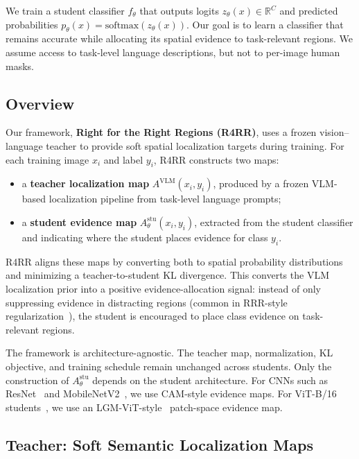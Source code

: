 We train a student classifier $f_\theta$ that outputs logits $z_\theta(x)\in\mathbb{R}^{C}$ and predicted probabilities $p_\theta(x)=\mathrm{softmax}(z_\theta(x))$. Our goal is to learn a classifier that remains accurate while allocating its spatial evidence to task-relevant regions. We assume access to task-level language descriptions, but not to per-image human masks.

\subsection{Overview}
\label{sec:overview}

Our framework, \textbf{Right for the Right Regions (R4RR)}, uses a frozen vision--language teacher to provide soft spatial localization targets during training. For each training image $x_i$ and label $y_i$, R4RR constructs two maps:
\begin{itemize}
\item a \textbf{teacher localization map} $A^{\mathrm{VLM}}(x_i,y_i)$, produced by a frozen VLM-based localization pipeline from task-level language prompts;
\item a \textbf{student evidence map} $A^{\mathrm{stu}}_\theta(x_i,y_i)$, extracted from the student classifier and indicating where the student places evidence for class $y_i$.
\end{itemize}

R4RR aligns these maps by converting both to spatial probability distributions and minimizing a teacher-to-student KL divergence. This converts the VLM localization prior into a positive evidence-allocation signal: instead of only suppressing evidence in distracting regions (common in RRR-style regularization~\cite{ross2017right}), the student is encouraged to place class evidence on task-relevant regions.

The framework is architecture-agnostic. The teacher map, normalization, KL objective, and training schedule remain unchanged across students. Only the construction of $A^{\mathrm{stu}}_\theta$ depends on the student architecture. For CNNs such as ResNet~\cite{he2016deep} and MobileNetV2~\cite{sandler2018mobilenetv2}, we use CAM-style evidence maps. For ViT-B/16 students~\cite{dosovitskiy2020image}, we use an LGM-ViT-style~\cite{ben2024localization} patch-space evidence map.

\subsection{Teacher: Soft Semantic Localization Maps}
\label{sec:teacher}

